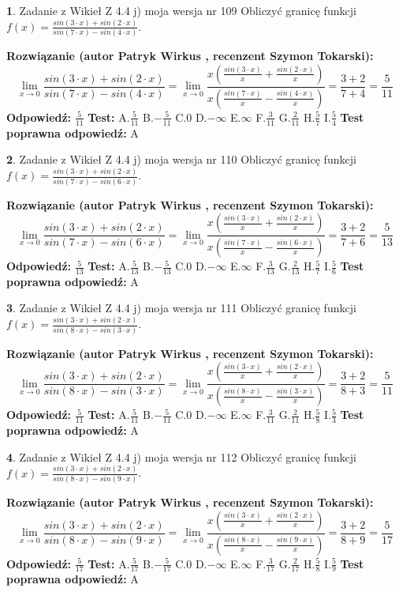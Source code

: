 \documentclass[12pt, a4paper]{article}
\theoremstyle{definition} %
\newtheorem{zad}{}
\newcommand{\zadStart}[1]{\begin{zad}#1\newline}
\newcommand{\zadStop}{\end{zad}}
\newcommand{\rozwStart}[2]{\noindent \textbf{Rozwiązanie (autor #1 , recenzent #2): }\newline}
\newcommand{\rozwStop}{\newline}
\newcommand{\odpStart}{\noindent \textbf{Odpowiedź:}\newline}
\newcommand{\odpStop}{\newline}
\newcommand{\testStart}{\noindent \textbf{Test:}\newline}
\newcommand{\testStop}{\newline}
\newcommand{\kluczStart}{\noindent \textbf{Test poprawna odpowiedź:}\newline}
\newcommand{\kluczStop}{\newline}
\begin{document}
\zadStart{Zadanie z Wikieł Z 4.4 j) moja wersja nr 109}
Obliczyć granicę funkcji $f(x)=\frac{sin(3\cdot x) +sin(2\cdot x)}{sin(7\cdot x) -sin(4\cdot x)}$.
\zadStop
\rozwStart{Patryk Wirkus}{Szymon Tokarski}
$$\lim\limits_{x\to 0}\frac{sin(3\cdot x) +sin(2\cdot x)}{sin(7\cdot x) -sin(4\cdot x)}=\lim\limits_{x\to 0}\frac{x(\frac{sin(3\cdot x)}{x}+\frac{sin(2\cdot x)}{x})}{x(\frac{sin(7\cdot x)}{x}-\frac{sin(4\cdot x)}{x})}=\frac{3+2}{7+4} = \frac{5}{11}$$
\rozwStop
\odpStart
$\frac{5}{11}$
\odpStop
\testStart
A.$\frac{5}{11}$
B.$-\frac{5}{11}$
C.$0$
D.$-\infty$
E.$\infty$
F.$\frac{3}{11}$
G.$\frac{2}{11}$
H.$\frac{5}{7}$
I.$\frac{5}{4}$
\testStop
\kluczStart
A
\kluczStop



\zadStart{Zadanie z Wikieł Z 4.4 j) moja wersja nr 110}
Obliczyć granicę funkcji $f(x)=\frac{sin(3\cdot x) +sin(2\cdot x)}{sin(7\cdot x) -sin(6\cdot x)}$.
\zadStop
\rozwStart{Patryk Wirkus}{Szymon Tokarski}
$$\lim\limits_{x\to 0}\frac{sin(3\cdot x) +sin(2\cdot x)}{sin(7\cdot x) -sin(6\cdot x)}=\lim\limits_{x\to 0}\frac{x(\frac{sin(3\cdot x)}{x}+\frac{sin(2\cdot x)}{x})}{x(\frac{sin(7\cdot x)}{x}-\frac{sin(6\cdot x)}{x})}=\frac{3+2}{7+6} = \frac{5}{13}$$
\rozwStop
\odpStart
$\frac{5}{13}$
\odpStop
\testStart
A.$\frac{5}{13}$
B.$-\frac{5}{13}$
C.$0$
D.$-\infty$
E.$\infty$
F.$\frac{3}{13}$
G.$\frac{2}{13}$
H.$\frac{5}{7}$
I.$\frac{5}{6}$
\testStop
\kluczStart
A
\kluczStop



\zadStart{Zadanie z Wikieł Z 4.4 j) moja wersja nr 111}
Obliczyć granicę funkcji $f(x)=\frac{sin(3\cdot x) +sin(2\cdot x)}{sin(8\cdot x) -sin(3\cdot x)}$.
\zadStop
\rozwStart{Patryk Wirkus}{Szymon Tokarski}
$$\lim\limits_{x\to 0}\frac{sin(3\cdot x) +sin(2\cdot x)}{sin(8\cdot x) -sin(3\cdot x)}=\lim\limits_{x\to 0}\frac{x(\frac{sin(3\cdot x)}{x}+\frac{sin(2\cdot x)}{x})}{x(\frac{sin(8\cdot x)}{x}-\frac{sin(3\cdot x)}{x})}=\frac{3+2}{8+3} = \frac{5}{11}$$
\rozwStop
\odpStart
$\frac{5}{11}$
\odpStop
\testStart
A.$\frac{5}{11}$
B.$-\frac{5}{11}$
C.$0$
D.$-\infty$
E.$\infty$
F.$\frac{3}{11}$
G.$\frac{2}{11}$
H.$\frac{5}{8}$
I.$\frac{5}{3}$
\testStop
\kluczStart
A
\kluczStop



\zadStart{Zadanie z Wikieł Z 4.4 j) moja wersja nr 112}
Obliczyć granicę funkcji $f(x)=\frac{sin(3\cdot x) +sin(2\cdot x)}{sin(8\cdot x) -sin(9\cdot x)}$.
\zadStop
\rozwStart{Patryk Wirkus}{Szymon Tokarski}
$$\lim\limits_{x\to 0}\frac{sin(3\cdot x) +sin(2\cdot x)}{sin(8\cdot x) -sin(9\cdot x)}=\lim\limits_{x\to 0}\frac{x(\frac{sin(3\cdot x)}{x}+\frac{sin(2\cdot x)}{x})}{x(\frac{sin(8\cdot x)}{x}-\frac{sin(9\cdot x)}{x})}=\frac{3+2}{8+9} = \frac{5}{17}$$
\rozwStop
\odpStart
$\frac{5}{17}$
\odpStop
\testStart
A.$\frac{5}{17}$
B.$-\frac{5}{17}$
C.$0$
D.$-\infty$
E.$\infty$
F.$\frac{3}{17}$
G.$\frac{2}{17}$
H.$\frac{5}{8}$
I.$\frac{5}{9}$
\testStop
\kluczStart
A
\kluczStop
\end{document}
